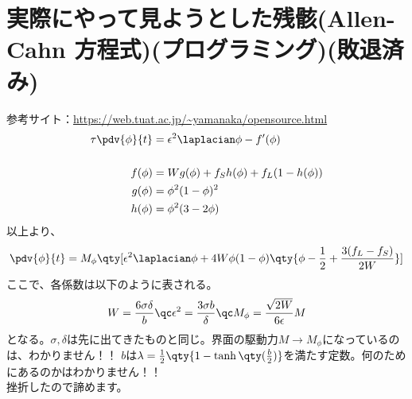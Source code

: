 \documentclass[twocolumn,landscape]{ltjsarticle}
\begin{document}
\section{実際にやって見ようとした残骸(Allen-Cahn 方程式)(プログラミング)(敗退済み)}
参考サイト：\url{https://web.tuat.ac.jp/~yamanaka/opensource.html}
\begin{equation}
  \begin{split}
    \tau\pdv{\phi}{t}&=\epsilon^2\laplacian\phi-f'(\phi)\\
    \\
    f(\phi)&=W g(\phi)+f_S h(\phi)+f_L(1-h(\phi))\\
    g(\phi)&=\phi^2(1-\phi)^2\\
    h(\phi)&=\phi^2(3-2\phi)
  \end{split}
\end{equation}
以上より、
\begin{equation}
  \pdv{\phi}{t}=M_\phi\qty[\epsilon^2\laplacian\phi+4W\phi(1-\phi)\qty{\phi-\frac{1}{2}+\frac{3(f_L-f_S)}{2W}}]
\end{equation}
ここで、各係数は以下のように表される。
\begin{equation}
  W=\frac{6\sigma\delta}{b}\qc\epsilon^2=\frac{3\sigma b}{\delta}\qc M_\phi=\frac{\sqrt{2W}}{6\epsilon}M
\end{equation}
となる。$\sigma,\delta$は先に出てきたものと同じ。界面の駆動力$M\rightarrow M_\phi$になっているのは、\color{red}わかりません！！\color{black}
$b$は$\lambda=\frac{1}{2}\qty{1-\tanh\qty(\frac{b}{2})}$を満たす定数。\color{red}何のためにあるのかはわかりません！！\color{black}\\
挫折したので諦めます。
\end{document}
